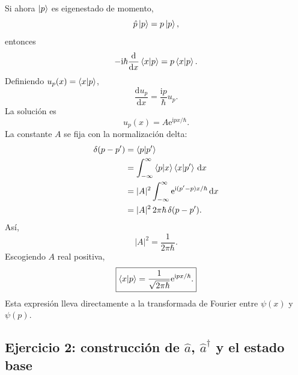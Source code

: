 \documentclass[11pt]{article}
\newcommand{\ii}{\mathrm{i}}
\newcommand{\ee}{\mathrm{e}}
\newcommand{\dd}{\mathrm{d}}
\newcommand{\adag}{\hat a^\dagger}
\begin{document}
Si ahora $\ket p$ es eigenestado de momento,
\begin{equation}
  \hat p\ket p=p\ket p,
\end{equation}
entonces
\begin{equation}
  -\ii\hbar\frac{\dd}{\dd x}\braket{x|p}
  =
  p\braket{x|p}.
\end{equation}
Definiendo $u_p(x)=\braket{x|p}$,
\begin{equation}
  \frac{\dd u_p}{\dd x}
  =
  \frac{\ii p}{\hbar}u_p.
\end{equation}
La soluci\'on es
\begin{equation}
  u_p(x)=A\ee^{\ii px/\hbar}.
\end{equation}
La constante $A$ se fija con la normalizaci\'on delta:
\begin{align}
  \delta(p-p')
  &=
  \braket{p|p'}\\
  &=
  \int_{-\infty}^{\infty}
  \braket{p|x}\braket{x|p'}\,\dd x\\
  &=
  |A|^2
  \int_{-\infty}^{\infty}
  \ee^{\ii(p'-p)x/\hbar}\,\dd x\\
  &=
  |A|^2\,2\pi\hbar\,\delta(p-p').
\end{align}
As\'i,
\begin{equation}
  |A|^2=\frac{1}{2\pi\hbar}.
\end{equation}
Escogiendo $A$ real positiva,
\begin{equation}
  \boxed{
  \braket{x|p}
  =
  \frac{1}{\sqrt{2\pi\hbar}}\ee^{\ii px/\hbar}.
  }
\end{equation}
Esta expresi\'on lleva directamente a la transformada de Fourier entre
$\psi(x)$ y $\psi(p)$.

\subsection*{Ejercicio 2: construcci\'on de $\hat a$, $\adag$ y el estado base}
\end{document}
